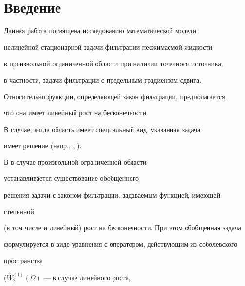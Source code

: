 \date{}




\pagestyle{plain} %







\maketitle


\label{begin}








\section*{Введение}





Данная работа посвящена исследованию математической модели


нелинейной стационарной задачи фильтрации несжимаемой жидкости


в произвольной ограниченной области при наличии точечного источника,


в частности, задачи фильтрации с предельным градиентом сдвига.


Относительно функции, определяющей закон фильтрации, предполагается,


что она имеет линейный рост на бесконечности.


В случае, когда область имеет специальный вид, указанная задача


имеет решение (напр., \cite{BE_75}, \cite{MMSkv_71}).


В \cite{KL_73_IV} в случае произвольной ограниченной области


устанавливается существование обобщенного


решения задачи с законом фильтрации, задаваемым функцией, имеющей


степенной


(в том числе и линейный) рост на бесконечности. При этом обобщенная задача


формулируется в виде уравнения с оператором, действующим из соболевского


пространства


($\overset{\circ}{W}{}^{(1)}_{2} (\Omega)$ --- в случае линейного роста,


